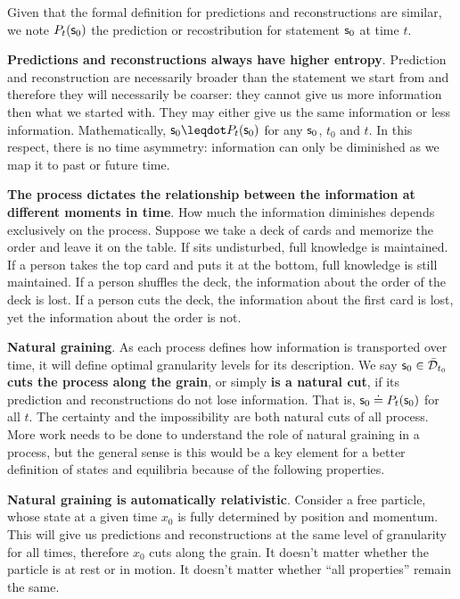 \documentclass[10pt, onecolumn, longbibliography, nofootinbib]{revtex4-2}
\begin{document}
Given that the formal definition for predictions and reconstructions are similar, we note $P_{t}(\mathsf{s}_0)$ the prediction or recostribution for statement $\mathsf{s}_0$ at time $t$.

\textbf{Predictions and reconstructions always have higher entropy}. Prediction and reconstruction are necessarily broader than the statement we start from and therefore they will necessarily be coarser: they cannot give us more information then what we started with. They may either give us the same information or less information. Mathematically, $\stmt_0 \finer P_t(\stmt_0)$ for any $\mathsf{s}_0$, $t_0$ and $t$. In this respect, there is no time asymmetry: information can only be diminished as we map it to past or future time.

\textbf{The process dictates the relationship between the information at different moments in time}. How much the information diminishes depends exclusively on the process. Suppose we take a deck of cards and memorize the order and leave it on the table. If sits undisturbed, full knowledge is maintained. If a person takes the top card and puts it at the bottom, full knowledge is still maintained. If a person shuffles the deck, the information about the order of the deck is lost. If a person cuts the deck, the information about the first card is lost, yet the information about the order is not.

\textbf{Natural graining}. As each process defines how information is transported over time, it will define optimal granularity levels for its description. We say $\mathsf{s}_0 \in \bar{\mathcal{D}}_{t_0}$ \textbf{cuts the process along the grain}, or simply \textbf{is a natural cut}, if its prediction and reconstructions do not lose information. That is, $\mathsf{s}_0 \doteq P_t(\mathsf{s}_0)$ for all $t$. The certainty and the impossibility are both natural cuts of all process. More work needs to be done to understand the role of natural graining in a process, but the general sense is this would be a key element for a better definition of states and equilibria because of the following properties.

\textbf{Natural graining is automatically relativistic}. Consider a free particle, whose state at a given time $x_0$ is fully determined by position and momentum. This will give us predictions and reconstructions at the same level of granularity for all times, therefore $x_0$ cuts along the grain. It doesn't matter whether the particle is at rest or in motion. It doesn't matter whether ``all properties'' remain the same.
\end{document}
